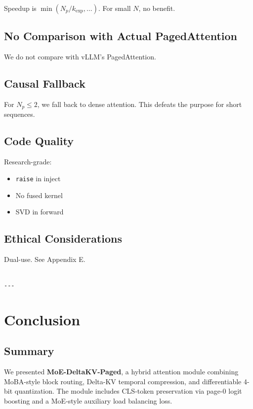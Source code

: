 Speedup is $\min(N_p/k_\text{exp}, \ldots)$. For small $N$, no benefit.

\subsection{No Comparison with Actual PagedAttention}

We do not compare with vLLM's PagedAttention.

\subsection{Causal Fallback}

For $N_p \leq 2$, we fall back to dense attention. This defeats the purpose 
for short sequences.

\subsection{Code Quality}

Research-grade:
\begin{itemize}
\item \texttt{raise} in inject
\item No fused kernel
\item SVD in forward

\end{itemize}
\subsection{Ethical Considerations}

Dual-use. See Appendix E.
\begin{lstlisting}

---
\end{lstlisting}

\section{Conclusion}

\subsection{Summary}

We presented \textbf{MoE-DeltaKV-Paged}, a hybrid attention module combining 
MoBA-style block routing, Delta-KV temporal compression, and differentiable 
4-bit quantization. The module includes CLS-token preservation via page-0 
logit boosting and a MoE-style auxiliary load balancing loss.

